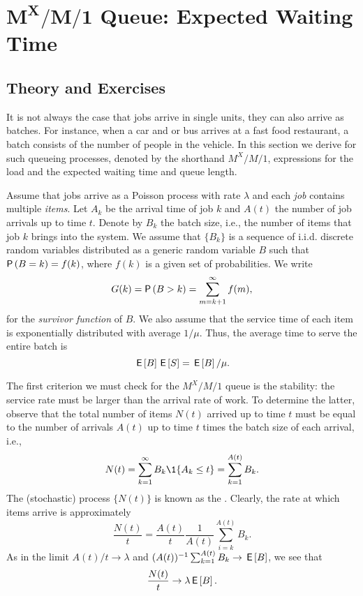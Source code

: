 \section
[$M^X/M/1$ Queue: Expected Waiting Time]
{$\mathbf{M^X/M/1}$ Queue: Expected Waiting Time}
\label{sec:mxm1-queue:-expected}

\subsection*{Theory and Exercises}


It is not always the case that jobs arrive in single units, they can
also arrive as batches. For instance, when a car and or bus arrives at a fast
food restaurant, a batch consists of the number of people in the vehicle.  In this section we derive for such queueing processes, denoted by the shorthand $M^X/M/1$, expressions for the load and the expected waiting time and queue length. 


Assume that jobs arrive as a Poisson process with rate $\lambda$ and
each \emph{job} contains multiple \emph{items}.  Let $A_k$ be the
arrival time of job $k$ and $A(t)$ the number of job arrivals up to
time $t$. Denote by $B_k$ the batch size, i.e., the number of items that job $k$ brings into
the system.  We assume that $\{B_k\}$ is a sequence of
i.i.d. discrete random variables distributed as a generic random variable $B$
such that $\P{B = k} = f(k)$, where $f(k)$ is a given set of
probabilities.  We write
\begin{equation*}
  G(k) = \P{B>k} = \sum_{m=k+1}^\infty f(m),
\end{equation*}
for the \emph{survivor function} of $B$.  We also assume that the
service time of each item is exponentially distributed with average
$1/\mu$. Thus, the average time to serve the entire batch is
\begin{equation*}
\,\mathsf{E}\left[B\right]\,\mathsf{E}\left[S\right]=\,\mathsf{E}\left[B\right]/\mu.
\end{equation*}



The first criterion we must check for the $M^X/M/1$ queue is the
stability: the service rate must be larger than the arrival rate of
work. To determine the latter, observe that the total number of items $N(t)$
arrived up to time $t$ must be equal to the number of arrivals $A(t)$
up to time $t$ times the batch size of each arrival, i.e.,
\begin{equation*}
N(t)=  \sum_{k=1}^\infty B_k \1{A_k \leq t} = \sum_{k=1}^{A(t)} B_k.
\end{equation*}
The (stochastic) process $\{N(t)\}$ is known as the . Clearly, the rate at which items arrive is
approximately
\begin{equation*}
  \frac{N(t)}t = \frac{A(t)}t \frac1{A(t)}\sum_{i=k}^{A(t)} B_k.
\end{equation*}
As in  the limit $A(t)/t \to \lambda$ and $(A(t))^{-1}\sum_{k=1}^{A(t)} B_k \to \,\mathsf{E}\left[B\right]$, we see that
\begin{align*}
\frac{N(t)}t \to \lambda \,\mathsf{E}\left[B\right].
\end{align*}

